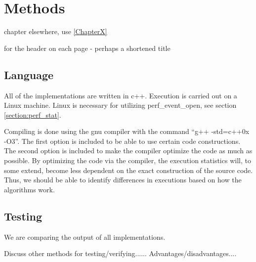 
\chapter{Methods} %

\label{Chapter0} %
chapter elsewhere, use \ref{ChapterX}

for the header on each page - perhaps a shortened title

\section{Language}
All of the implementations are written in c++. Execution is carried out on a
Linux machine. Linux is necessary for utilizing perf\_event\_open, see section
\ref{section:perf_stat}.

Compiling is done using the gnu compiler with the command ``g++ -std=c++0x
-O3''.
The first option is included to be able to use certain code constructions.
The second option is included to make the compiler optimize the code as much as
possible.
By optimizing the code via the compiler, the execution statistics will, to some
extend, become less dependent on the exact construction of the source code.
Thus, we should be able to identify differences in executions based on how the
algorithms work.




\section{Testing}
We are comparing the output of all implementations.

Discuss other methods for testing/verifying...... Advantages/disadvantages....


